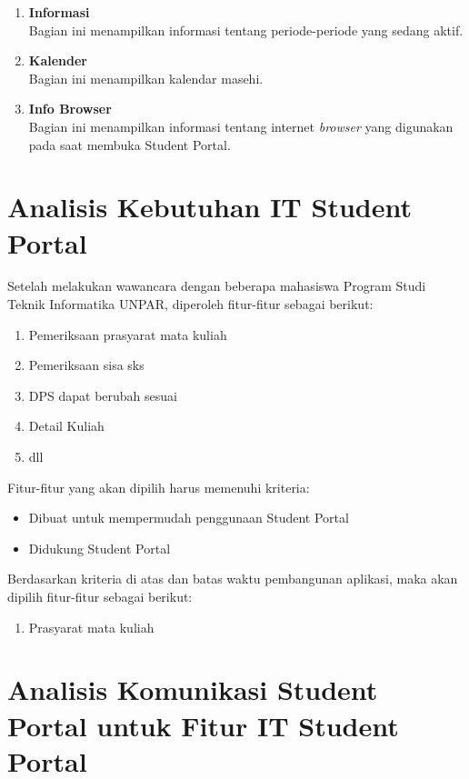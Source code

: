 \begin{enumerate}
	\item \textbf{Informasi}\\
		Bagian ini menampilkan informasi tentang periode-periode yang sedang aktif.
	\item \textbf{Kalender}\\
		Bagian ini menampilkan kalendar masehi.
	\item \textbf{Info Browser}\\
		Bagian ini menampilkan informasi tentang internet \textit{browser} yang digunakan pada saat membuka Student Portal. 
\end{enumerate}

\section{Analisis Kebutuhan IT Student Portal}
Setelah melakukan wawancara dengan beberapa mahasiswa Program Studi Teknik Informatika UNPAR, diperoleh fitur-fitur sebagai berikut:
\begin{enumerate}
	\item Pemeriksaan prasyarat mata kuliah
	\item Pemeriksaan sisa sks
	\item DPS dapat berubah sesuai
	\item Detail Kuliah
	\item dll
\end{enumerate}
Fitur-fitur yang akan dipilih harus memenuhi kriteria:
\begin{itemize}
	\item Dibuat untuk mempermudah penggunaan Student Portal
	\item Didukung Student Portal
\end{itemize}
Berdasarkan kriteria di atas dan batas waktu pembangunan aplikasi, maka akan dipilih fitur-fitur sebagai berikut:
\begin{enumerate}
	\item Prasyarat mata kuliah
\end{enumerate}

\section{Analisis Komunikasi Student Portal untuk Fitur IT Student Portal}

